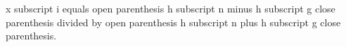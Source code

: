 x subscript i equals open parenthesis h subscript n minus h subscript g close parenthesis divided by open parenthesis h subscript n plus h subscript g close parenthesis.